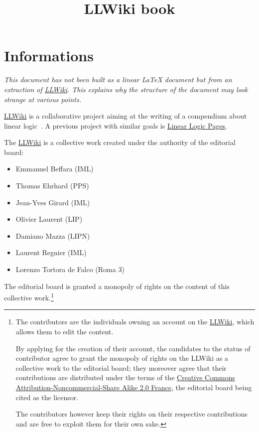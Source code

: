 \documentclass[a4paper,11pt,oneside]{book}
\title{LLWiki book}
\begin{document}
\maketitle

\chapter*{Informations}

\textit{This document has not been built as a linear \LaTeX{} document but from an extraction of \href{http://llwiki.ens-lyon.fr/}{LLWiki}.
This explains why the structure of the document may look strange at various points.}

\vspace{1.5cm}

\href{http://llwiki.ens-lyon.fr/}{LLWiki} is a collaborative project aiming at the writing of a compendium about linear logic~\cite{linearlogic}.
A previous project with similar goals is \href{https://www.i2m.univ-amu.fr/perso/yves.lafont/pub/llpages.pdf}{Linear Logic Pages}.

The \href{http://llwiki.ens-lyon.fr/}{LLWiki} is a collective work created under the authority of the editorial board:
\begin{itemize}
\item Emmanuel Beffara (IML)
\item Thomas Ehrhard (PPS)
\item Jean-Yves Girard (IML)
\item Olivier Laurent (LIP)
\item Damiano Mazza (LIPN)
\item Laurent Regnier (IML)
\item Lorenzo Tortora de Falco (Roma 3)
\end{itemize}

The editorial board is granted a monopoly of rights on the content of this collective work.\footnote{The contributors are the individuals owning an account on the \href{http://llwiki.ens-lyon.fr/}{LLWiki}, which allows them to edit the content.

By applying for the creation of their account, the candidates to the status of contributor agree to grant the monopoly of rights on the LLWiki as a collective work to the editorial board; they moreover agree that their contributions are distributed under the terms of the \href{http://creativecommons.org/licenses/by-nc-sa/2.0/fr/deed.en License}{Creative Commons Attribution-Noncommercial-Share Alike 2.0 France}, the editorial board being cited as the licensor.

The contributors however keep their rights on their respective contributions and are free to exploit them for their own sake.}
\end{document}
